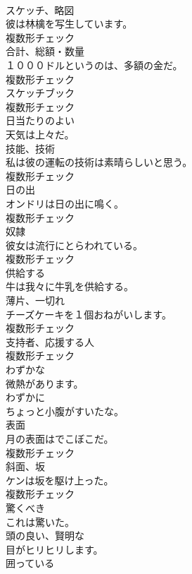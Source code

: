 \documentclass[8pt]{extreport}
\begin{document}
\begin{CJK}{UTF8}{min}
\\	[名詞]	スケッチ、略図	
\\	彼は林檎を写生しています。	
\\	複数形チェック
\\	[名詞]	合計、総額・数量	
\\	１０００ドルというのは、多額の金だ。	
\\	複数形チェック
\\	[名詞]	スケッチブック	
\\	複数形チェック
\\	[形容詞]	日当たりのよい	
\\	天気は上々だ。	
\\	[名詞]	技能、技術	
\\	私は彼の運転の技術は素晴らしいと思う。	
\\	複数形チェック
\\	[名詞]	日の出	
\\	オンドリは日の出に鳴く。	
\\	複数形チェック
\\	[名詞]	奴隷	
\\	彼女は流行にとらわれている。	
\\	複数形チェック
\\	[動詞]	供給する	
\\	牛は我々に牛乳を供給する。	
\\	[名詞]	薄片、一切れ	
\\	チーズケーキを１個おねがいします。	
\\	複数形チェック
\\	[名詞]	支持者、応援する人	
\\	複数形チェック
\\	[形容詞]	わずかな	
\\	微熱があります。	
\\	[副詞]	わずかに	
\\	ちょっと小腹がすいたな。	
\\	[名詞]	表面	
\\	月の表面はでこぼこだ。	
\\	複数形チェック
\\	[名詞]	斜面、坂	
\\	ケンは坂を駆け上った。	
\\	複数形チェック
\\	[形容詞]	驚くべき	
\\	これは驚いた。	
\\	[形容詞]	頭の良い、賢明な	
\\	目がヒリヒリします。	
\\	[動詞]	囲っている	

\end{CJK}
\end{document}
